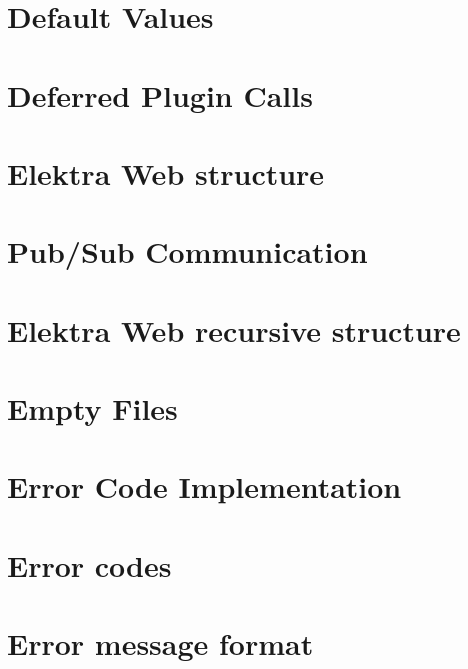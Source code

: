 \let\mypdfximage\pdfximage\def\pdfximage{\immediate\mypdfximage}\documentclass[twoside]{book}
\newcommand{\+}{\discretionary{\mbox{\scriptsize$\hookleftarrow$}}{}{}}
\begin{document}
\chapter{Default Values}
\label{doc_decisions_default_values_md}

\chapter{Deferred Plugin Calls}
\label{doc_decisions_deferred_plugin_calls_md}

\chapter{Elektra Web structure}
\label{doc_decisions_elektra_web_md}

\chapter{Pub/\+Sub Communication}
\label{doc_decisions_elektra_web_pubsub_md}

\chapter{Elektra Web recursive structure}
\label{doc_decisions_elektra_web_recursive_md}

\chapter{Empty Files}
\label{doc_decisions_empty_files_md}

\chapter{Error Code Implementation}
\label{doc_decisions_error_code_implementation_md}

\chapter{Error codes}
\label{doc_decisions_error_codes_md}

\chapter{Error message format}
\label{doc_decisions_error_message_format_md}

\end{document}
